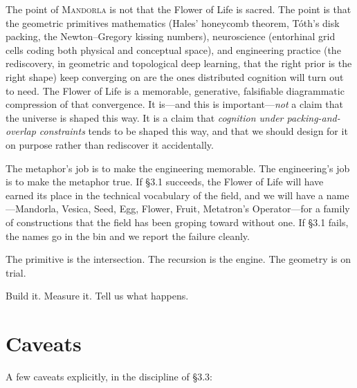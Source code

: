 \documentclass[11pt,a4paper]{article}
\begin{document}
The point of \textsc{Mandorla} is not that the Flower of Life is sacred. The point is that the geometric primitives mathematics (Hales' honeycomb theorem, T\'oth's disk packing, the Newton--Gregory kissing numbers), neuroscience (entorhinal grid cells coding both physical and conceptual space), and engineering practice (the rediscovery, in geometric and topological deep learning, that the right prior is the right shape) keep converging on are the ones distributed cognition will turn out to need. The Flower of Life is a memorable, generative, falsifiable diagrammatic compression of that convergence. It is---and this is important---\emph{not} a claim that the universe is shaped this way. It is a claim that \emph{cognition under packing-and-overlap constraints} tends to be shaped this way, and that we should design for it on purpose rather than rediscover it accidentally.

The metaphor's job is to make the engineering memorable. The engineering's job is to make the metaphor true. If \S 3.1 succeeds, the Flower of Life will have earned its place in the technical vocabulary of the field, and we will have a name---Mandorla, Vesica, Seed, Egg, Flower, Fruit, Metatron's Operator---for a family of constructions that the field has been groping toward without one. If \S 3.1 fails, the names go in the bin and we report the failure cleanly.

The primitive is the intersection. The recursion is the engine. The geometry is on trial.

Build it. Measure it. Tell us what happens.

\section*{Caveats}

A few caveats explicitly, in the discipline of \S 3.3:
\end{document}
